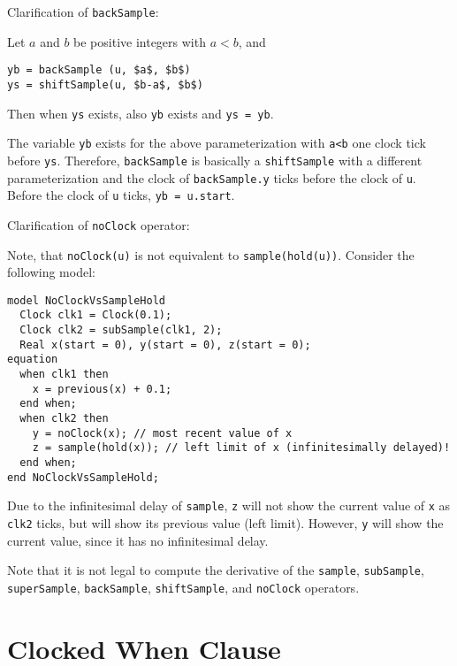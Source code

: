 \begin{nonnormative}
Clarification of \lstinline!backSample!:

Let $a$ and $b$ be positive integers with $a < b$, and
\begin{lstlisting}[language=modelica]
yb = backSample (u, $a$, $b$)
ys = shiftSample(u, $b-a$, $b$)
\end{lstlisting}

Then when \lstinline!ys! exists, also \lstinline!yb! exists and \lstinline!ys = yb!.

The variable \lstinline!yb! exists for the above parameterization with \lstinline!a<b! one clock tick before \lstinline!ys!.  Therefore, \lstinline!backSample! is
basically a \lstinline!shiftSample! with a different parameterization and the clock of \lstinline!backSample.y! ticks before the clock of \lstinline!u!.  Before the
clock of \lstinline!u! ticks, \lstinline!yb = u.start!.
\end{nonnormative}

\begin{nonnormative}
Clarification of \lstinline!noClock! operator:

Note, that \lstinline!noClock(u)! is not equivalent to \lstinline!sample(hold(u))!.  Consider the following model:
\begin{lstlisting}[language=modelica]
model NoClockVsSampleHold
  Clock clk1 = Clock(0.1);
  Clock clk2 = subSample(clk1, 2);
  Real x(start = 0), y(start = 0), z(start = 0);
equation
  when clk1 then
    x = previous(x) + 0.1;
  end when;
  when clk2 then
    y = noClock(x); // most recent value of x
    z = sample(hold(x)); // left limit of x (infinitesimally delayed)!
  end when;
end NoClockVsSampleHold;
\end{lstlisting}

Due to the infinitesimal delay of \lstinline!sample!, \lstinline!z! will not show the current value of \lstinline!x! as \lstinline!clk2! ticks, but will show its previous value (left limit).  However, \lstinline!y! will show the current value, since it has no infinitesimal delay.
\end{nonnormative}

Note that it is not legal to compute the derivative of the \lstinline!sample!, \lstinline!subSample!, \lstinline!superSample!, \lstinline!backSample!,
\lstinline!shiftSample!, and \lstinline!noClock! operators.

\section{Clocked When Clause}\label{clocked-when-clause}

